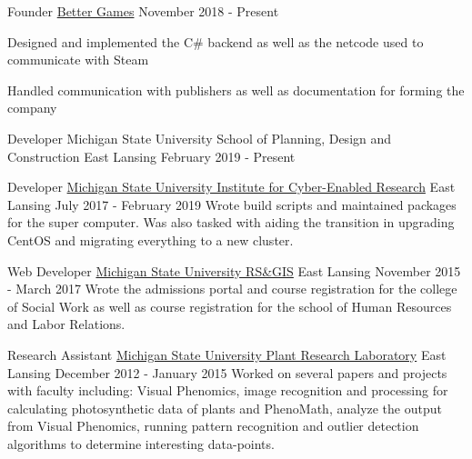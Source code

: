 
\begin{cventries}
  \cventry
    {Founder} %
    {\href{https://better-games.org}{Better Games}} %
    {} %
    {November 2018 - Present} %
    {
        \begin{cvitems}
          \item {Designed and implemented the C\# backend as well as the netcode used to communicate with Steam}
          \item {Handled communication with publishers as well as documentation for forming the company}
        \end{cvitems}
    }

  \cventry
    {Developer}
    {Michigan State University School of Planning, Design and Construction}
    {East Lansing}
    {February 2019 - Present}
    {
      {}
    }

  \cventry
    {Developer}
    {\href{https://icer.msu.edu}{Michigan State University Institute for Cyber-Enabled Research}}
    {East Lansing}
    {July 2017 - February 2019}
    {
        {Wrote build scripts and maintained packages for the super computer. Was also tasked with aiding the transition
        in upgrading CentOS and migrating everything to a new cluster.}
    }

  \cventry
    {Web Developer}
    {\href{http://www.rsgis.msu.edu}{Michigan State University RS\&GIS}}
    {East Lansing}
    {November 2015 - March 2017}
    {
      {Wrote the admissions portal and course registration for the college of Social Work as well as
      course registration for the school of Human Resources and Labor Relations.}
    }

  \cventry
    {Research Assistant}
    {\href{https://prl.natsci.msu.edu/research-tech/center-for-advanced-algal-and-plant-phenotyping}{Michigan State University Plant Research Laboratory}}
    {East Lansing}
    {December 2012 - January 2015}
    {
      {Worked on several papers and projects with faculty including: Visual Phenomics, image recognition
      and processing for calculating photosynthetic data of plants and PhenoMath, analyze the output from Visual Phenomics,
      running pattern recognition and outlier detection algorithms to determine interesting data-points. }
    }
\end{cventries}
